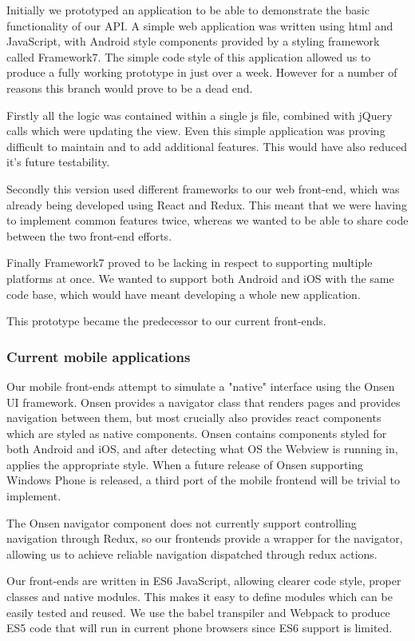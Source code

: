 Initially we prototyped an application to be able to demonstrate the basic functionality of our API. A simple web application was written using html and JavaScript, with Android style components provided by a styling framework called Framework7. The simple code style of this application allowed us to produce a fully working prototype in just over a week. However for a number of reasons this branch would prove to be a dead end. 

Firstly all the logic was contained within a single js file, combined with jQuery calls which were updating the view. Even this simple application was proving difficult to maintain and to add additional features. This would have also reduced it's future testability. 

Secondly this version used different frameworks to our web front-end, which was already being developed using React and Redux. This meant that we were having to implement common features twice, whereas we wanted to be able to share code between the two front-end efforts.

Finally Framework7 proved to be lacking in respect to supporting multiple platforms at once. We wanted to support both Android and iOS with the same code base, which would have meant developing a whole new application.

This prototype became the predecessor to our current front-ends.

\subsubsection{Current mobile applications}


Our mobile front-ends attempt to simulate a "native" interface using the Onsen UI framework. Onsen provides a navigator class that renders pages and provides navigation between them, but most crucially also provides react components which are styled as native components. Onsen contains components styled for both Android and iOS, and after detecting what OS the Webview is running in, applies the appropriate style. When a future release of Onsen supporting Windows Phone is released, a third port of the mobile frontend will be trivial to implement.


The Onsen navigator component does not currently support controlling navigation through Redux, so our frontends provide a wrapper for the navigator, allowing us to achieve reliable navigation dispatched through redux actions. 

Our front-ends are written in ES6 JavaScript, allowing clearer code style, proper classes and native modules. This makes it easy to define modules which can be easily tested and reused. We use the babel transpiler and Webpack to produce ES5 code that will run in current phone browsers since ES6 support is limited. 
 
